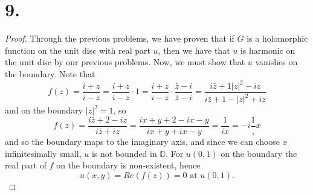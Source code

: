 \documentclass{article}
\begin{document}
\section*{9.}
\begin{proof}
  Through the previous problems, we have proven that if $G$ is a holomorphic function on the unit disc with real part $u$, then we have that $u $ is harmonic on the unit disc by our previous problems. Now, we must show that $u $ vanishes on the boundary. Note that 
  \[
  f(z) = \frac{i + z}{i - z} = \frac{i + z}{i - z}\cdot 1 = \frac{i + z}{i - z} \cdot \frac{\bar{z}- i}{\bar{z} - i} = \frac{i\bar{z}+ 1 |z|^2 -iz}{i\bar{z}+1-|z|^2 + iz} 
  \]
  and on the boundary $|z|^2 = 1$, so 
  \[
  f(z) = \frac{i\bar{z}+ 2 -iz}{i\bar{z} + iz} = \frac{ix + y + 2 -ix - y}{ix + y + ix-y} = \frac{1}{ix} = -i \frac{1},{x}  
  \]
  and so the boundary maps to the imaginary axis, and since we can choose $x$ infinitesimally small, $u$ is not bounded in $\mathbb{D}$. For $u(0, 1)$ on the boundary the real part of $f$ on the boundary is non-existent, hence 
  \[
  u(x, y) = Re(f(z)) = 0 \text{ at } u(0, 1). 
  \]

\end{proof}
\end{document}
